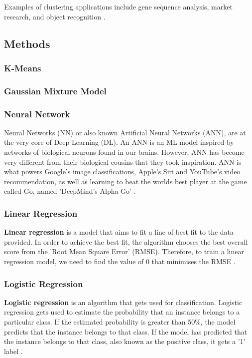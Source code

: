 	Examples of clustering applications include gene sequence analysis, market research, and object recognition \cite{matlanintrotoml}.
	
	
	\subsection{Methods}
	
	\subsubsection{K-Means}
	\subsubsection{Gaussian Mixture Model}
	\subsubsection{Neural Network}
	Neural Networks (NN) or also known Artificial Neural Networks (ANN), are at the very core of Deep Learning (DL). An ANN is an ML model inspired by networks of biological neurons found in our brains. However, ANN has become very different from their biological cousins that they took inspiration. ANN is what powers Google's image classifications, Apple's Siri and YouTube's video recommendation, as well as learning to beat the worlds best player at the game called Go, named 'DeepMind's Alpha Go' \cite{geron2019hands}.
	
	\subsubsection{Linear Regression}
	\textbf{Linear regression} is a model that aims to fit a line of best fit to the data provided. In order to achieve the best fit, the algorithm chooses the best overall score from the 'Root Mean Square Error' (RMSE). Therefore, to train a linear regression model, we need to find the value of $0$ that minimises the RMSE \cite{geron2019hands}.
	
	\subsubsection{Logistic Regression}
	\textbf{Logistic regression} is an algorithm that gets used for classification. Logistic regression gets used to estimate the probability that an instance belongs to a particular class. If the estimated probability is greater than 50\%, the model predicts that the instance belongs to that class. If the model has predicted that the instance belongs to that class, also known as the positive class, it gets a '1' label \cite{handson book}. 
	

